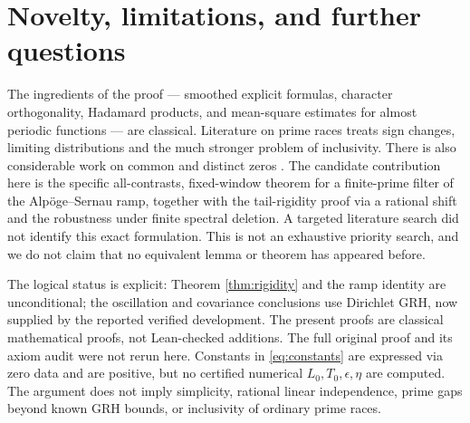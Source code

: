 \documentclass[11pt]{article}
\begin{document}
\section{Novelty, limitations, and further questions}
The ingredients of the proof --- smoothed explicit formulas, character orthogonality, Hadamard products, and mean-square estimates for almost periodic functions --- are classical. Literature on prime races \cite{rs,mn,devin} treats sign changes, limiting distributions and the much stronger problem of inclusivity. There is also considerable work on common and distinct zeros \cite{fujii,banks}. The candidate contribution here is the specific all-contrasts, fixed-window theorem for a finite-prime filter of the Alp\"oge--Sernau ramp, together with the tail-rigidity proof via a rational shift and the robustness under finite spectral deletion. A targeted literature search did not identify this exact formulation. This is not an exhaustive priority search, and we do not claim that no equivalent lemma or theorem has appeared before.

The logical status is explicit: Theorem \ref{thm:rigidity} and the ramp identity are unconditional; the oscillation and covariance conclusions use Dirichlet GRH, now supplied by the reported verified development. The present proofs are classical mathematical proofs, not Lean-checked additions. The full original proof and its axiom audit were not rerun here. Constants in \eqref{eq:constants} are expressed via zero data and are positive, but no certified numerical $L_0,T_0,\epsilon,\eta$ are computed. The argument does not imply simplicity, rational linear independence, prime gaps beyond known GRH bounds, or inclusivity of ordinary prime races.
\end{document}

